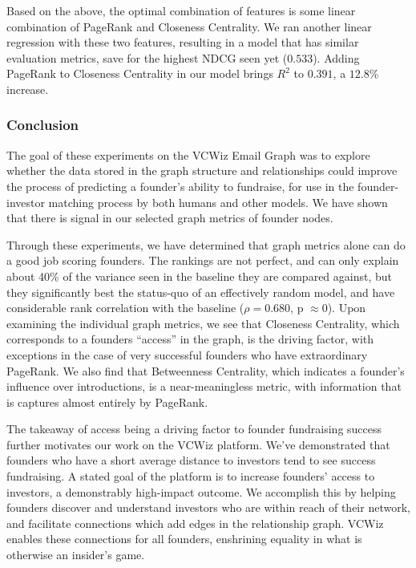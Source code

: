 Based on the above, the optimal combination of features is some linear combination of PageRank and Closeness Centrality. We ran another linear regression with these two features, resulting in a model that has similar evaluation metrics, save for the highest NDCG seen yet ($0.533$). Adding PageRank to Closeness Centrality in our model brings $R^2$ to $0.391$, a $12.8$\% increase.

\subsubsection{Conclusion}

The goal of these experiments on the VCWiz Email Graph was to explore whether the data stored in the graph structure and relationships could improve the process of predicting a founder's ability to fundraise, for use in the founder-investor matching process by both humans and other models. We have shown that there is signal in our selected graph metrics of founder nodes.

Through these experiments, we have determined that graph metrics alone can do a good job scoring founders. The rankings are not perfect, and can only explain about 40\% of the variance seen in the baseline they are compared against, but they significantly best the status-quo of an effectively random model, and have considerable rank correlation with the baseline ($\rho = 0.680$, p $\approx 0$). Upon examining the individual graph metrics, we see that Closeness Centrality, which corresponds to a founders ``access'' in the graph, is the driving factor, with exceptions in the case of very successful founders who have extraordinary PageRank. We also find that Betweenness Centrality, which indicates a founder's influence over introductions, is a near-meaningless metric, with information that is captures almost entirely by PageRank.

The takeaway of access being a driving factor to founder fundraising success further motivates our work on the VCWiz platform. We've demonstrated that founders who have a short average distance to investors tend to see success fundraising. A stated goal of the platform is to increase founders' access to investors, a demonstrably high-impact outcome. We accomplish this by helping founders discover and understand investors who are within reach of their network, and facilitate connections which add edges in the relationship graph. VCWiz enables these connections for all founders, enshrining equality in what is otherwise an insider's game.

